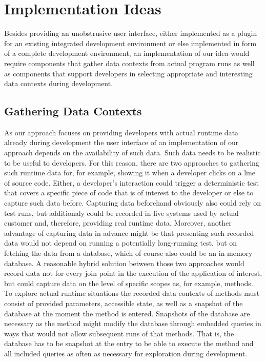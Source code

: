 \section{Implementation Ideas} \label{sec:IMPLEMENTATION_IDEAS}
Besides providing an unobstrusive user interface, either implemented as a plugin for an existing integrated development environment or else implemented in form of a complete development environment, an implementation of our idea would require components that gather data contexts from actual program runs as well as components that support developers in selecting appropriate and interesting data contexts during development.


\subsection{Gathering Data Contexts}
As our approach focuses on providing developers with actual runtime data already during development the user interface of an implementation of our approach depends on the availability of such data.
Such data needs to be realistic to be useful to developers.
For this reason, there are two approaches to gathering such runtime data for, for example, showing it when a developer clicks on a line of source code.
Either, a developer's interaction could trigger a deterministic test that covers a specific piece of code that is of interest to the developer or else to capture such data before.
Capturing data beforehand obviously also could rely on test runs, but additionaly could be recorded in live systems used by actual customer and, therefore, providing real runtime data.
Moreover, another advantage of capturing data in advance might be that presenting such recorded data would not depend on running a potentially long-running test, but on fetching the data from a database, which of course also could be an in-memory database.
A reasonable hybrid solution between those two approaches would record data not for every join point in the execution of the application of interest, but could capture data on the level of specific scopes as, for example, methods.
To explore actual runtime situations the recorded data contexts of methods must consist of provided parameters, accessible state, as well as a snapshot of the database at the moment the method is entered.
Snapshots of the database are necessary as the method might modify the database through embedded queries in ways that would not allow subsequent runs of that methods.
That is, the database has to be snapshot at the entry to be able to execute the method and all included queries as often as necessary for exploration during development.
